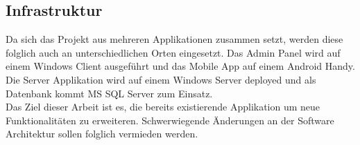 \subsection{Infrastruktur}
Da sich das Projekt aus mehreren Applikationen zusammen setzt, werden diese folglich auch an unterschiedlichen Orten eingesetzt. Das Admin Panel wird auf einem Windows Client ausgeführt und das Mobile App auf einem Android Handy. Die Server Applikation wird auf einem Windows Server deployed und als Datenbank kommt MS SQL Server zum Einsatz.
\\
Das Ziel dieser Arbeit ist es, die bereits existierende Applikation um neue Funktionalitäten zu erweiteren. Schwerwiegende Änderungen an der Software Architektur sollen folglich vermieden werden.

\newpage